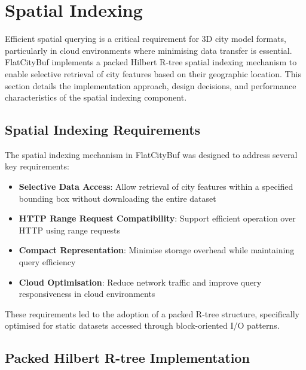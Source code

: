 \section{Spatial Indexing}
\label{methodology:spatial_index}

Efficient spatial querying is a critical requirement for 3D city model formats, particularly in cloud environments where minimising data transfer is essential. FlatCityBuf implements a packed Hilbert R-tree spatial indexing mechanism to enable selective retrieval of city features based on their geographic location. This section details the implementation approach, design decisions, and performance characteristics of the spatial indexing component.

\subsection{Spatial Indexing Requirements}
\label{methodology:spatial_index:requirements}

The spatial indexing mechanism in FlatCityBuf was designed to address several key requirements:

\begin{itemize}
    \item \textbf{Selective Data Access}: Allow retrieval of city features within a specified bounding box without downloading the entire dataset
    \item \textbf{HTTP Range Request Compatibility}: Support efficient operation over HTTP using range requests
    \item \textbf{Compact Representation}: Minimise storage overhead while maintaining query efficiency
    \item \textbf{Cloud Optimisation}: Reduce network traffic and improve query responsiveness in cloud environments
\end{itemize}

These requirements led to the adoption of a packed R-tree structure, specifically optimised for static datasets accessed through block-oriented I/O patterns.

\subsection{Packed Hilbert R-tree Implementation}
\label{methodology:spatial_index:packed_rtree_implementation}


